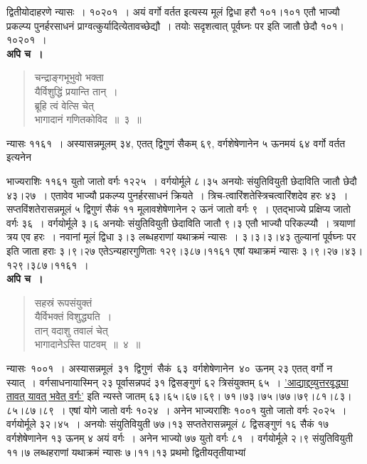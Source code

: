 \documentclass[11pt, openany]{book}
\begin{document}
द्वितीयोदाहरणे न्यासः~। १०२०१~। अयं वर्गो वर्तत इत्यस्य मूलं द्विधा हरौ १०१।१०१ एतौ भाज्यौ प्रकल्प्य पुनर्हरसाधनं प्राग्वत्कुर्यादित्येतावच्छेद्यौ~। तयोः सदृशत्वात् पूर्वघ्नः पर इति जातौ छेदौ १०१।१०२०१~।\\
 
\textbf{अपि च~।}

\begin{quote}
{\ex चन्द्राङ्गभूभुवो भक्ता\\
यैर्विशुद्धिं प्रयान्ति तान्~।\\
ब्रूहि त्वं वेत्सि चेत्\\
भागादानं गणितकोविद~॥~३~॥~}	
\end{quote}

न्यासः ११६१~। अस्यासन्नमूलम् ३४, एतत् द्विगुणं सैकम् ६९, वर्गशेषेणानेन ५ ऊनमयं ६४ वर्गो वर्तत इत्यनेन

\newpage

\noindent भाज्यराशिः ११६१ युतो जातो वर्गः १२२५~। वर्गयोर्मूले ८।३५ अनयोः संयुतिवियुती छेदाविति जातौ छेदौ ४३।२७~। एतावेव भाज्यौ प्रकल्प्य पुनर्हरसाधनं क्रियते~। त्रिच-त्वारिंशतेस्त्रिचत्वारिंशदेव हरः ४३~। सप्तविंशतेरासन्नमूलं ५ द्विगुणं सैकं ११ मूलावशेषेणानेन २ ऊनं जातो वर्गः ९~। एतद्भाज्ये प्रक्षिप्य जातो वर्गः ३६~। वर्गयोर्मूले ३।६ अनयोः संयुतिवियुती छेदाविति जातौ ९।३ एतौ भाज्यौ परिकल्प्यौ~। त्रयाणां त्रय एव हरः~। नवानां मूलं द्विधा ३।३ लब्धहराणां यथाक्रमं न्यासः~। ३।३।३।४३ तुल्यानां पूर्वघ्नः पर इति जाता हराः ३।९।२७ एतेऽन्यहारगुणिताः १२९।३८७।११६१ एषां यथाक्रमं न्यासः ३।९।२७।४३।१२९।३८७।११६१~। \\

\textbf{अपि च~।}

\begin{quote}
{\ex सहस्रं रूपसंयुक्तं\\
यैर्विभक्तं विशुद्ध्यति~।\\
तान् वदाशु तवालं चेत्\\
भागादानेऽस्ति पाटवम्~॥~४~॥	}
\end{quote}

न्यासः \,१००१~। अस्यासन्नमूलं \,३१ \,द्विगुणं \,सैकं \,६३ \,वर्गशेषेणानेन \,४० \,ऊनम् २३ एतत् वर्गो न स्यात्~। वर्गसाधनायास्मिन् २३ पूर्वासन्नपदं ३१ द्विसङ्गुणं ६२ त्रिसंयुक्तम् ६५~। \hyperref[11.8]{'आद्याद्द्व्युत्तरवृद्ध्या तावत् यावत् भवेत् वर्गः'} इति न्यस्ते जातम् ६३।६५।६७।६९। ७१।७३।७५।७७।७९।८१।८३।८५।८७।८९~। एषां योगे जातो वर्गः १०२४~। अनेन भाज्यराशिः १००१ युतो जातो वर्गः २०२५~। वर्गयोर्मूले ३२।४५~। अनयोः संयुतिवियुती ७७।१३ सप्ततेरासन्नमूलं ८ द्विसङ्गुणं १६ सैकं १७ वर्गशेषेणानेन १३ ऊनम् ४ अयं वर्गः~। अनेन भाज्यो ७७ युतो वर्गः ८१~। वर्गयोर्मूले २।९ संयुतिवियुती ११।७ लब्धहराणां यथाक्रमं न्यासः ७।११।१३ प्रथमो द्वितीयतृतीयाभ्यां
\end{document}
